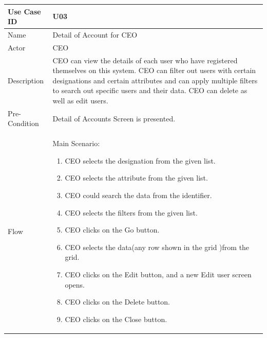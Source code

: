 \documentclass[12pt,a4paper]{report}
\begin{document}
\begin{tabular}{ | m{3cm} | m{12cm}| } \hline

Use Case ID & U03  \\\hline

Name  	    & Detail of Account for CEO  \\ \hline

Actor     	& CEO\\ \hline

Description &  CEO can view the details of each user who have registered themselves on this system. CEO can filter out users with certain designations and certain attributes and can apply multiple filters to search out specific users and  their data. CEO can delete as well as edit users.\\ \hline

Pre-Condition &  Detail of Accounts Screen is presented. \\ \hline

Flow       & Main Scenario:

\begin{enumerate}
\item  CEO selects the designation from the given list.
\item  CEO selects the attribute from the given list. 
\item  CEO could search the data from the identifier.
\item  CEO selects the filters from the given list.
\item  CEO clicks on the Go button.
\item  CEO selects the data(any row shown in the grid )from the grid. 
\item  CEO clicks on the Edit button, and a new Edit user screen opens.
\item  CEO clicks on the Delete button.
\item  CEO clicks on the Close button.


\end{enumerate}\\ \hline
\end{tabular}
\end{document}
